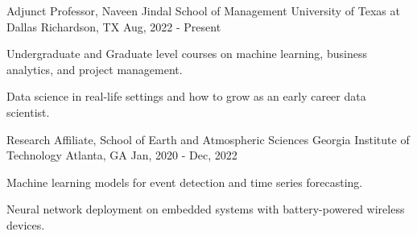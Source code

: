 

\begin{cventries}

\cventry
{Adjunct Professor, Naveen Jindal School of Management} %
{University of Texas at Dallas} %
{Richardson, TX} %
{Aug, 2022 - Present} %
{
	\begin{cvitems} %
		\item {Undergraduate and Graduate level courses on machine learning, business analytics, and project management.}
		\item {Data science in real-life settings and how to grow as an early career data scientist.}
	\end{cvitems}
}

\cventry
{Research Affiliate, School of Earth and Atmospheric Sciences} %
{Georgia Institute of Technology} %
{Atlanta, GA} %
{Jan, 2020 - Dec, 2022} %
{
	\begin{cvitems} %
		\item {Machine learning models for event detection and time series forecasting.}
		\item {Neural network deployment on embedded systems with battery-powered wireless devices.}
	\end{cvitems}
}

%

\end{cventries}
